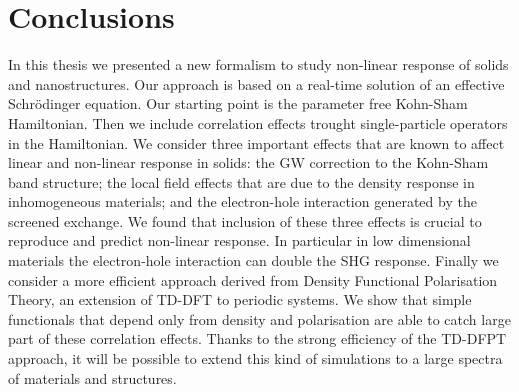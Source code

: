 \chapter{Conclusions} 
In this thesis we presented a new formalism to study non-linear response of solids and nanostructures. Our approach is based on a real-time solution of an effective Schr\"odinger equation. Our starting point is the parameter free Kohn-Sham Hamiltonian. Then we include correlation effects trought single-particle operators in the Hamiltonian. We consider three important effects that are known to affect  linear and non-linear response in solids: the GW correction to the Kohn-Sham band structure; the local field effects that are due to the density response in inhomogeneous materials; and the electron-hole interaction generated by the screened exchange. We found that inclusion of these three effects is crucial to reproduce and predict non-linear response. In particular in low dimensional materials the electron-hole interaction can double the SHG response. Finally we consider a more efficient approach derived from Density Functional Polarisation Theory, an extension of TD-DFT to periodic systems. We show that simple functionals that depend only from density and polarisation are able to catch large part of these correlation effects. Thanks to the strong efficiency of the TD-DFPT approach, it will be possible to extend this kind of simulations to a large spectra of materials and structures.\\
